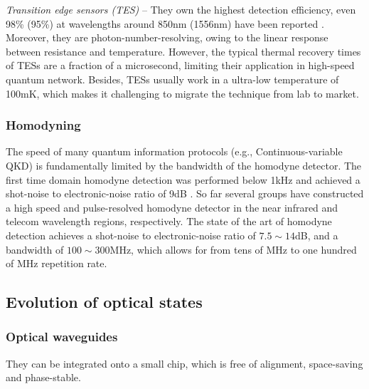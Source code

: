 \documentclass[aps,rmp,twocolumn,amsmath,amssymb,nofootinbib,superscriptaddress,longbibliography,floatfix,table-of-contents,eqsecnum]{revtex4-1}
\begin{document}
\textit{Transition edge sensors (TES)} -- They own the highest detection efficiency, even 98\% (95\%) at wavelengths around 850nm (1556nm) have been reported \cite{fukuda2011, lita2008}. Moreover, they are photon-number-resolving, owing to the linear response between resistance and temperature. However, the typical thermal recovery times of TESs are a fraction of a microsecond, limiting their application in high-speed quantum network. Besides, TESs usually work in a ultra-low temperature of 100mK, which makes it challenging to migrate the technique from lab to market.

%
%

\subsubsection{Homodyning} 

The speed of many quantum information protocols (e.g., Continuous-variable QKD) is fundamentally limited by the bandwidth of the homodyne detector. The first time domain homodyne detection was performed below 1kHz and achieved a shot-noise to electronic-noise ratio of 9dB \cite{winzer2010}. So far several groups \cite{zavatta2002time, okubo2008pulse, kumar2012versatile, chi2011balanced, duan2013} have constructed a high speed and pulse-resolved homodyne detector in the near infrared and telecom wavelength regions, respectively. The state of the art of homodyne detection achieves a shot-noise to electronic-noise ratio of \mbox{$7.5\sim 14$dB}, and a bandwidth of \mbox{$100\sim 300$MHz}, which allows for from tens of MHz to one hundred of MHz repetition rate.

%
%

\subsection{Evolution of optical states}  \label{sec:LO_evolution}

%
%

\subsubsection{Optical waveguides} 

They can be integrated onto a small chip, which is free of alignment, space-saving and phase-stable.
\end{document}
